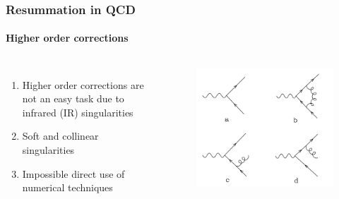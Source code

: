 \documentclass[aspectratio=43]{beamer}
\begin{document}
\begin{frame}

	\frametitle{Resummation in QCD}
	\framesubtitle{Higher order corrections}
	\begin{columns}
	
	
	\begin{enumerate}
		\item Higher order corrections are {\color{red}not an easy task} due to {\color{red} infrared (IR) singularities}
		\item Soft and collinear singularities
		\item Impossible direct use of numerical techniques
	\end{enumerate}
	
	\begin{figure}[!htb]
		\includegraphics[width = \linewidth]{plots/qcd_corrections.png}
	\end{figure}
	
	\end{columns}

\end{frame}
\end{document}
